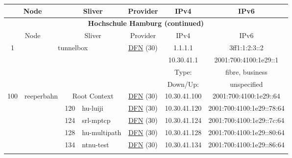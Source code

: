 \begin{small}
\begin{center}
\begin{longtable}{|c|c|c|c|c|c|c|c|}
 \multicolumn{2}{|p{8em}|}{Node} & \multicolumn{2}{|p{8em}|}{Sliver} & \multicolumn{2}{|p{8em}|}{Provider} & IPv4 & IPv6 \\ \hline
\endfirsthead
\hline
 \multicolumn{8}{|c|}{\textbf{Hochschule Hamburg (continued)}} \\ \hline
 \multicolumn{2}{|p{8em}|}{Node} & \multicolumn{2}{|p{8em}|}{Sliver} & \multicolumn{2}{|p{8em}|}{Provider} & IPv4 & IPv6 \\ \hline
\endhead
 \multirow{4}{*}{\tiny{1}} & \multicolumn{3}{|c|}{\multirow{4}{*}{\tiny{tunnelbox}}} & \multicolumn{2}{|c|}{\multirow{4}{*}{\tiny{\href{https://www.dfn.de}{DFN} (30)}}} & \tiny{1.1.1.1} & \tiny{3ff1:1:2:3::2} \\* \cline{7-7}\cline{8-8}
  & \multicolumn{3}{|c|}{} & \multicolumn{2}{|c|}{} & \tiny{10.30.41.1} & \tiny{2001:700:4100:1e29::1} \\* \cline{7-7}\cline{8-8}
  & \multicolumn{3}{|c|}{} & \multicolumn{2}{|c|}{} & Type: & fibre, business \\* \cline{7-7}\cline{8-8}
  & \multicolumn{3}{|c|}{} & \multicolumn{2}{|c|}{} & Down/Up:  & unspecified \\ \hline
 \multirow{7}{*}{\tiny{100}} & \multicolumn{1}{|l|}{\multirow{7}{*}{\tiny{reeperbahn}}} & \multicolumn{2}{|c|}{\tiny{Root Context}} & \multicolumn{2}{|c|}{\tiny{\href{https://www.dfn.de}{DFN} (30)}} & \tiny{10.30.41.100} & \tiny{2001:700:4100:1e29::64} \\* \cline{3-3}\cline{4-4}\cline{5-5}\cline{6-6}\cline{7-7}\cline{8-8}
  &  & \tiny{120} & \multicolumn{1}{|l|}{\tiny{hu-luiji}} & \multicolumn{2}{|c|}{\tiny{\href{https://www.dfn.de}{DFN} (30)}} & \tiny{10.30.41.120} & \tiny{2001:700:4100:1e29::78:64} \\* \cline{3-3}\cline{4-4}\cline{5-5}\cline{6-6}\cline{7-7}\cline{8-8}
  &  & \tiny{124} & \multicolumn{1}{|l|}{\tiny{srl-mptcp}} & \multicolumn{2}{|c|}{\tiny{\href{https://www.dfn.de}{DFN} (30)}} & \tiny{10.30.41.124} & \tiny{2001:700:4100:1e29::7c:64} \\* \cline{3-3}\cline{4-4}\cline{5-5}\cline{6-6}\cline{7-7}\cline{8-8}
  &  & \tiny{128} & \multicolumn{1}{|l|}{\tiny{hu-multipath}} & \multicolumn{2}{|c|}{\tiny{\href{https://www.dfn.de}{DFN} (30)}} & \tiny{10.30.41.128} & \tiny{2001:700:4100:1e29::80:64} \\* \cline{3-3}\cline{4-4}\cline{5-5}\cline{6-6}\cline{7-7}\cline{8-8}
  &  & \tiny{134} & \multicolumn{1}{|l|}{\tiny{ntnu-test}} & \multicolumn{2}{|c|}{\tiny{\href{https://www.dfn.de}{DFN} (30)}} & \tiny{10.30.41.134} & \tiny{2001:700:4100:1e29::86:64} \\* \cline{3-3}\cline{4-4}\cline{5-5}\cline{6-6}\cline{7-7}\cline{8-8}

\end{longtable}
\end{center}
\end{small}
